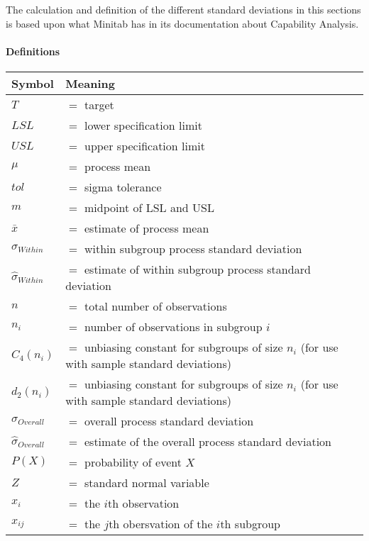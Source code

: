 \documentclass[11pt]{article}
\begin{document}
The calculation and definition of the different standard deviations in
this sections is based upon what Minitab has in its documentation about
Capability Analysis.

\hypertarget{definitions}{%
\paragraph{Definitions}\label{definitions}}

\begin{center}
  
\begin{tabular}{l l l}
  \toprule
  \textbf{Symbol}  & \textbf{Meaning} \\
  \midrule
  \( T \)                         & \(=\) target \\
  \( LSL \)                       & \(=\) lower specification limit \\
  \( USL \)                       & \(=\) upper specification limit \\
  \( \mu \)                       & \(=\) process mean \\
  \( tol \)                       & \(=\) sigma tolerance \\
  \( m \)                         & \(=\) midpoint of LSL and USL \\
  \( \bar x \)                    & \(=\) estimate of process mean \\
  \( \sigma_{Within} \)           & \(=\) within subgroup process standard deviation \\
  \( \hat \sigma_{Within} \)      & \(=\) estimate of within subgroup process standard deviation \\
  \( n \)                         & \(=\) total number of observations \\
  \( n_i \)                       & \(=\) number of observations in subgroup \(i\) \\
  \( C_4(n_i) \)                  & \(=\) unbiasing constant for subgroups of size \(n_i\) (for use with sample standard deviations)\\
  \( d_2(n_i) \)                  & \(=\) unbiasing constant for subgroups of size \(n_i\) (for use with sample standard deviations)\\
  \( \sigma_{Overall} \)          & \(=\) overall process standard deviation \\
  \( \hat \sigma_{Overall} \)     & \(=\) estimate of the overall process standard deviation \\
  \( P(X) \)                      & \(=\) probability of event \(X\) \\
  \( Z \)                         & \(=\) standard normal variable \\
  \( x_i \)                       & \(=\) the \(i\)th observation \\
  \( x_{ij} \)                    & \(=\) the \(j\)th obersvation of the \(i\)th subgroup \\
  \bottomrule
\end{tabular}
\end{center}
\end{document}
